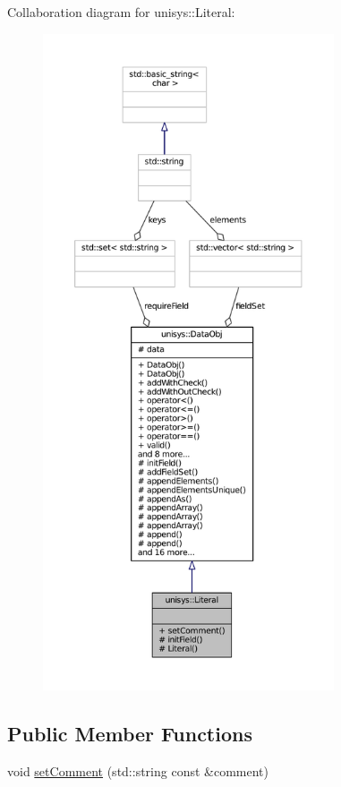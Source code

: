 Collaboration diagram for unisys\-:\-:Literal\-:
\nopagebreak
\begin{figure}[H]
\begin{center}
\leavevmode
\includegraphics[height=550pt]{classunisys_1_1Literal__coll__graph}
\end{center}
\end{figure}
\subsection*{Public Member Functions}
\begin{DoxyCompactItemize}
\item 
void \hyperlink{classunisys_1_1Literal_a9b894ab3626a1fdbfdd15489d8e1efd4}{set\-Comment} (std\-::string const \&comment)
\end{DoxyCompactItemize}
